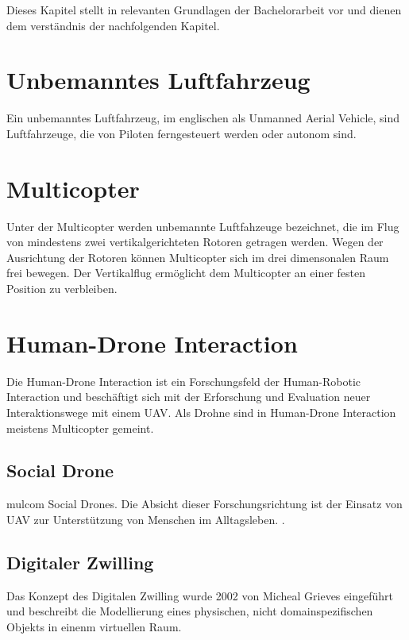 
Dieses Kapitel stellt in relevanten Grundlagen der Bachelorarbeit vor und dienen dem verständnis der nachfolgenden Kapitel. 

\section{Unbemanntes Luftfahrzeug}
Ein unbemanntes Luftfahrzeug, im englischen als Unmanned Aerial Vehicle, sind Luftfahrzeuge, die von Piloten ferngesteuert werden oder autonom sind. 

\section{Multicopter}
Unter der Multicopter werden unbemannte Luftfahzeuge bezeichnet, die im Flug von mindestens zwei vertikalgerichteten Rotoren getragen werden. Wegen der Ausrichtung der Rotoren können Multicopter sich im drei dimensonalen Raum frei bewegen. Der Vertikalflug ermöglicht dem Multicopter an einer festen Position zu verbleiben.


\section{Human-Drone Interaction}
Die Human-Drone Interaction ist ein Forschungsfeld der Human-Robotic Interaction \cite{Tezza2019TheStaOfArtHumDro}
und beschäftigt sich mit der Erforschung und Evaluation neuer Interaktionswege mit einem UAV. Als Drohne sind in Human-Drone Interaction meistens Multicopter gemeint.

\subsection{Social Drone}
mulcom{
Social Drones. Die Absicht dieser Forschungsrichtung ist der Einsatz von UAV zur Unterstützung von Menschen im Alltagsleben. \cite{Ghafu2021SocCom}.}

\subsection{Digitaler Zwilling}

Das Konzept des Digitalen Zwilling wurde 2002 von Micheal Grieves eingeführt und beschreibt die Modellierung eines physischen, nicht domainspezifischen Objekts in einenm virtuellen Raum.  

